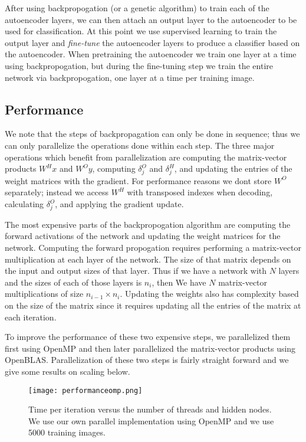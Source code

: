 After using backpropogation (or a genetic algorithm) to train each of the autoencoder layers, we can then attach an output layer to the autoencoder to be used for classification. At this
point we use supervised learning to train the output layer and \textit{fine-tune} the autoencoder layers to produce a classifier based on the autoencoder. When pretraining the autoencoder
we train one layer at a time using backpropogation, but during the fine-tuning step we train the entire network via backpropogation, one layer at a time per training image. 


\subsection{Performance}
We note that the steps of backpropagation can only be done in sequence; thus we can only parallelize the operations done within each step. The three major operations which benefit from parallelization are computing the matrix-vector products $W^{H}x$ and $W^{O}y$, computing $\delta^O_j$ and $\delta^H_j$, and updating the entries of the weight matrices with the gradient. For performance reasons we dont store $W^O$ separately; instead we access $W^H$ with transposed indexes when decoding, calculating $\delta^O_j$, and applying the gradient update.

The most expensive parts of the backpropogation algorithm are computing the forward activations of the network and updating the weight matrices for the network. Computing the forward propogation requires performing a matrix-vector multiplication at each layer of the network. The size of that matrix depends on the input and output sizes of that layer. Thus if we have a network with $N$ layers and the sizes of each of those layers is $n_i$, then We have $N$ matrix-vector multiplications of size $n_{i-1} \times n_i$. Updating the weights also has complexity based on the size of the matrix since it requires updating all the entries of the matrix at each iteration.

To improve the performance of these two expensive steps, we parallelized them first using OpenMP and then later parallelized the matrix-vector products using OpenBLAS. Parallelization of these two steps is fairly straight forward and we give some results on scaling below. 


\begin{figure}[h]
\centering
\texttt{[image: performanceomp.png]}
\caption{Time per iteration versus the number of threads and hidden nodes. We use our own parallel implementation using OpenMP and we use 5000 training images.}
\label{fig:performanceomp}
\end{figure}


